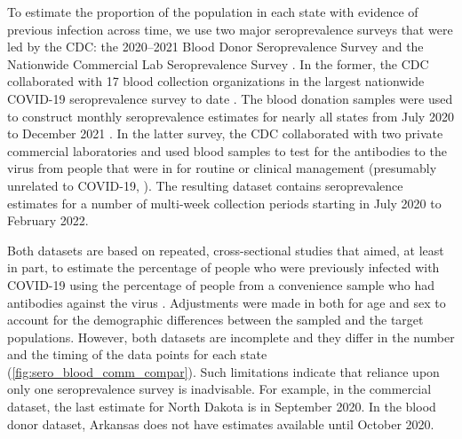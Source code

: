 \documentclass{article}
\begin{document}
To estimate the proportion of the population in each state with evidence of
previous infection across time, we use two major seroprevalence surveys that
were led by the CDC: the 2020--2021 Blood Donor Seroprevalence Survey and the
Nationwide Commercial Lab Seroprevalence Survey \citep{cdc2021blood,
cdc2021comm}. In the former, the CDC collaborated with 17 blood collection
organizations in the largest nationwide COVID-19 seroprevalence survey to date
\citep{cdc2021blood}. The blood donation samples were used to construct monthly
seroprevalence estimates for nearly all states from July 2020 to December 2021
\citep{jones2021estimated}. In the latter survey, the CDC collaborated with two
private commercial laboratories and used blood samples to test for the
antibodies to the virus from people that were in for routine or clinical
management (presumably unrelated to COVID-19, \citealp{bajema2021estimated}). The
resulting dataset contains seroprevalence estimates for a number of multi-week
collection periods starting in July 2020 to February 2022. 

Both datasets are based on repeated, cross-sectional studies that aimed, at
least in part, to estimate the percentage of people who were previously infected
with COVID-19 using the percentage of people from a convenience sample who had
antibodies against the virus \citep{bajema2021estimated, cdc2020data,
jones2021estimated}. Adjustments were made in both for age and sex to account
for the demographic differences between the sampled and the target populations.
However, both datasets are incomplete and they differ in the number and the
timing of the data points for each state (\autoref{fig:sero_blood_comm_compar}).
Such limitations indicate that reliance upon only one seroprevalence survey is
inadvisable. For example, in the commercial dataset, the last estimate for North
Dakota is in September 2020. In the blood donor dataset, Arkansas does not have
estimates available until October 2020. 
\end{document}
